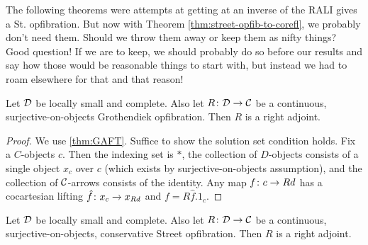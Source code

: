 \documentclass{amsart}
\begin{document}


{\daniel The following theorems were attempts at
  getting at an inverse of the RALI gives a
  St. opfibration.  But now with Theorem
  \ref{thm:street-opfib-to-corefl}, we probably
  don't need them.  Should we throw them away or
  keep them as nifty things?} {\chris Good question! If we are to keep, we should probably do so before our results and say how those would be reasonable things to start with, but instead we had to roam elsewhere for that and that reason!}

\begin{thm}
	Let $ \mathcal{D}$ be locally small and complete. Also let $ R \colon \mathcal{D} \to \mathcal{C} $ be a continuous, surjective-on-objects Grothendiek opfibration.  Then $ R $ is a right adjoint.
\end{thm}

\begin{proof}
	We use \ref{thm:GAFT}.  Suffice to show the solution set condition holds.  Fix a $ C $-objects $ c $.  Then the indexing set is $ \ast $, the collection of $ D $-objects consists of a single object $ x_c $ over $ c $ (which exists by surjective-on-objects assumption), and the collection of $ \mathcal{C} $-arrows consists of the identity.  Any map $ f \colon c \to Rd $ has a cocartesian lifting $ \hat{f} \colon x_c \to x_{Rd} $ and $ f = R \hat{f} . 1_c $.
\end{proof}

\begin{thm}
	Let $ \mathcal{D}$ be locally small and complete. Also let $ R \colon \mathcal{D} \to \mathcal{C} $ be a continuous, surjective-on-objects, conservative Street opfibration.  Then $ R $ is a right adjoint.
\end{thm}
\end{document}
